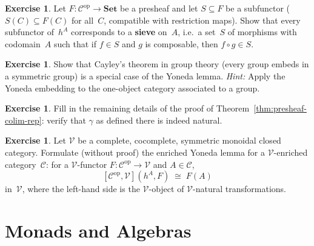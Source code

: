 \documentclass[a4paper,12pt]{book}
\newcommand{\Set}{\mathbf{Set}}
\newcommand{\op}{\mathrm{op}}
\theoremstyle{definition}
\newtheorem{exercise}[definition]{Exercise}
\theoremstyle{plain}
\theoremstyle{remark}
\begin{document}
\begin{exercise}\label{exer:subfunctor}
Let $F\colon\mathcal{C}^{\op}\to\Set$ be a presheaf and let
$S\subseteq F$ be a subfunctor ($S(C)\subseteq F(C)$ for all~$C$,
compatible with restriction maps).  Show that every subfunctor
of~$h^A$ corresponds to a \textbf{sieve} on~$A$, i.e.\ a set~$S$ of
morphisms with codomain~$A$ such that if $f\in S$ and $g$ is composable,
then $f\circ g\in S$.
\end{exercise}

\begin{exercise}\label{exer:cayley-yoneda}
Show that Cayley's theorem in group theory (every group embeds in a
symmetric group) is a special case of the Yoneda lemma.
\emph{Hint:} Apply the Yoneda embedding to the one-object category
associated to a group.
\end{exercise}

\begin{exercise}\label{exer:presheaf-colim-rep}
Fill in the remaining details of the proof of
Theorem~\ref{thm:presheaf-colim-rep}: verify that $\gamma$ as defined
there is indeed natural.
\end{exercise}

\begin{exercise}\label{exer:yoneda-enriched}
Let $\mathcal{V}$ be a complete, cocomplete, symmetric monoidal closed
category.  Formulate (without proof) the enriched Yoneda lemma for a
$\mathcal{V}$-enriched category~$\mathcal{C}$: for a
$\mathcal{V}$-functor $F\colon\mathcal{C}^{\op}\to\mathcal{V}$ and
$A\in\mathcal{C}$,
\[
    [\mathcal{C}^{\op},\mathcal{V}](h^A,F) \;\cong\; F(A)
\]
in~$\mathcal{V}$, where the left-hand side is the $\mathcal{V}$-object
of $\mathcal{V}$-natural transformations.
\end{exercise}




\chapter{Monads and Algebras}\label{ch:monads}
\minitoc
\end{document}
